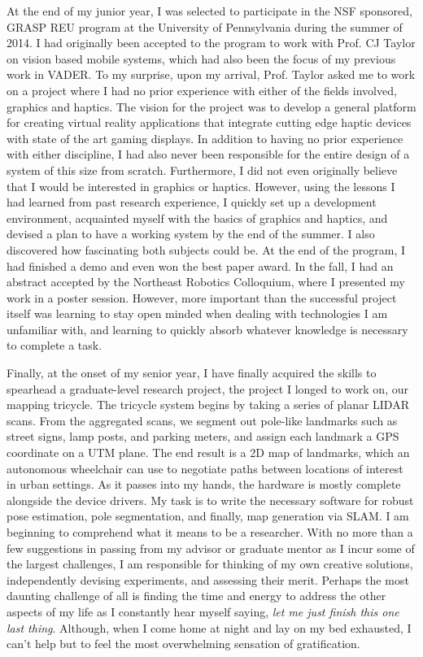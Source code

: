 \documentclass[10pt]{article}
\begin{document}
At the end of my junior year, I was selected to participate in the NSF
sponsored, GRASP REU program at the University of Pennsylvania during the
summer of 2014. I had originally been accepted to the program to work with
Prof. CJ Taylor on vision based mobile systems, which had also been the focus
of my previous work in VADER. To my surprise, upon my arrival, Prof. Taylor
asked me to work on a project where I had no prior experience with either of
the fields involved, graphics and haptics. The vision for the project was to
develop a general platform for creating virtual reality applications that
integrate cutting edge haptic devices with state of the art gaming displays. In
addition to having no prior experience with either discipline, I had also never
been responsible for the entire design of a system of this size from scratch.
Furthermore, I did not even originally believe that I would be interested in
graphics or haptics.  However, using the lessons I had learned from past
research experience, I quickly set up a development environment, acquainted
myself with the basics of graphics and haptics, and devised a plan to have a
working system by the end of the summer. I also discovered how fascinating both
subjects could be. At the end of the program, I had finished a demo and even
won the best paper award. In the fall, I had an abstract accepted by the
Northeast Robotics Colloquium, where I presented my work in a poster session.
However, more important than the successful project itself was learning to stay
open minded when dealing with technologies I am unfamiliar with, and learning
to quickly absorb whatever knowledge is necessary to complete a task.

Finally, at the onset of my senior year, I have finally acquired the skills to
spearhead a graduate-level research project, the project I longed to work on,
our mapping tricycle. The tricycle system begins by taking a series of planar
LIDAR scans. From the aggregated scans, we segment out pole-like landmarks such
as street signs, lamp posts, and parking meters, and assign each landmark a GPS
coordinate on a UTM plane.  The end result is a 2D map of landmarks, which an
autonomous wheelchair can use to negotiate paths between locations of interest
in urban settings. As it passes into my hands, the hardware is mostly complete
alongside the device drivers. My task is to write the necessary software for
robust pose estimation, pole segmentation, and finally, map generation via
SLAM. I am beginning to comprehend what it means to be a researcher. With no
more than a few suggestions in passing from my advisor or graduate mentor as I
incur some of the largest challenges, I am responsible for thinking of my own
creative solutions, independently devising experiments, and assessing their
merit.  Perhaps the most daunting challenge of all is finding the time  and
energy to address the other aspects of my life as I constantly hear myself
saying, \emph{let me just finish this one last thing}. Although, when I come
home at night and lay on my bed exhausted, I can't help but to feel the most
overwhelming sensation of gratification.
\end{document}
